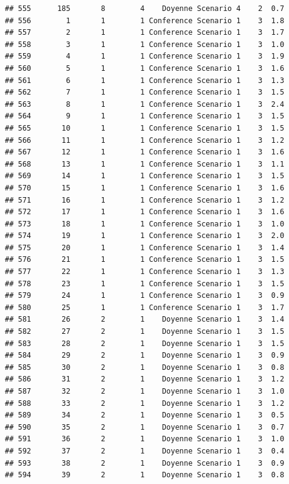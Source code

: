 \documentclass[
]{article}
\begin{document}
\begin{verbatim}
## 555      185       8        4    Doyenne Scenario 4    2  0.7
## 556        1       1        1 Conference Scenario 1    3  1.8
## 557        2       1        1 Conference Scenario 1    3  1.7
## 558        3       1        1 Conference Scenario 1    3  1.0
## 559        4       1        1 Conference Scenario 1    3  1.9
## 560        5       1        1 Conference Scenario 1    3  1.6
## 561        6       1        1 Conference Scenario 1    3  1.3
## 562        7       1        1 Conference Scenario 1    3  1.5
## 563        8       1        1 Conference Scenario 1    3  2.4
## 564        9       1        1 Conference Scenario 1    3  1.5
## 565       10       1        1 Conference Scenario 1    3  1.5
## 566       11       1        1 Conference Scenario 1    3  1.2
## 567       12       1        1 Conference Scenario 1    3  1.6
## 568       13       1        1 Conference Scenario 1    3  1.1
## 569       14       1        1 Conference Scenario 1    3  1.5
## 570       15       1        1 Conference Scenario 1    3  1.6
## 571       16       1        1 Conference Scenario 1    3  1.2
## 572       17       1        1 Conference Scenario 1    3  1.6
## 573       18       1        1 Conference Scenario 1    3  1.0
## 574       19       1        1 Conference Scenario 1    3  2.0
## 575       20       1        1 Conference Scenario 1    3  1.4
## 576       21       1        1 Conference Scenario 1    3  1.5
## 577       22       1        1 Conference Scenario 1    3  1.3
## 578       23       1        1 Conference Scenario 1    3  1.5
## 579       24       1        1 Conference Scenario 1    3  0.9
## 580       25       1        1 Conference Scenario 1    3  1.7
## 581       26       2        1    Doyenne Scenario 1    3  1.4
## 582       27       2        1    Doyenne Scenario 1    3  1.5
## 583       28       2        1    Doyenne Scenario 1    3  1.5
## 584       29       2        1    Doyenne Scenario 1    3  0.9
## 585       30       2        1    Doyenne Scenario 1    3  0.8
## 586       31       2        1    Doyenne Scenario 1    3  1.2
## 587       32       2        1    Doyenne Scenario 1    3  1.0
## 588       33       2        1    Doyenne Scenario 1    3  1.2
## 589       34       2        1    Doyenne Scenario 1    3  0.5
## 590       35       2        1    Doyenne Scenario 1    3  0.7
## 591       36       2        1    Doyenne Scenario 1    3  1.0
## 592       37       2        1    Doyenne Scenario 1    3  0.4
## 593       38       2        1    Doyenne Scenario 1    3  0.9
## 594       39       2        1    Doyenne Scenario 1    3  0.8

\end{verbatim}
\end{document}
